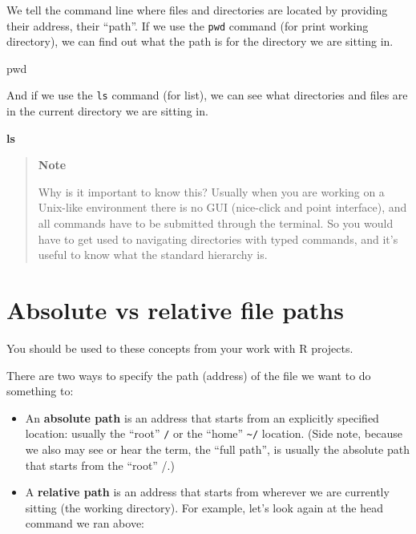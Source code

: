 \documentclass[
]{book}
\newenvironment{Shaded}{\begin{snugshade}}{\end{snugshade}}
\newcommand{\BuiltInTok}[1]{#1}
\newcommand{\FunctionTok}[1]{\textcolor[rgb]{0.13,0.29,0.53}{\textbf{#1}}}
\begin{document}
We tell the command line where files and directories are located by providing their address, their ``path''. If we use the \texttt{pwd} command (for print working directory), we can find out what the path is for the directory we are sitting in.

\begin{Shaded}
\begin{Highlighting}[]
    \BuiltInTok{pwd}
\end{Highlighting}
\end{Shaded}

And if we use the \texttt{ls} command (for list), we can see what directories and files are in the current directory we are sitting in.

\begin{Shaded}
\begin{Highlighting}[]
    \FunctionTok{ls}
\end{Highlighting}
\end{Shaded}

\begin{quote}
\textbf{Note}

Why is it important to know this? Usually when you are working on a Unix-like environment there is no GUI (nice-click and point interface), and all commands have to be submitted through the terminal. So you would have to get used to navigating directories with typed commands, and it's useful to know what the standard hierarchy is.
\end{quote}

\hypertarget{absolute-vs-relative-file-paths}{%
\section{Absolute vs relative file paths}\label{absolute-vs-relative-file-paths}}

You should be used to these concepts from your work with R projects.

There are two ways to specify the path (address) of the file we want to do something to:

\begin{itemize}
\item
  An \textbf{absolute path} is an address that starts from an explicitly specified location: usually the ``root'' \texttt{/} or the ``home'' \texttt{\textasciitilde{}/} location. (Side note, because we also may see or hear the term, the ``full path'', is usually the absolute path that starts from the ``root'' /.)
\item
  A \textbf{relative path} is an address that starts from wherever we are currently sitting (the working directory). For example, let's look again at the head command we ran above:
\end{itemize}
\end{document}
